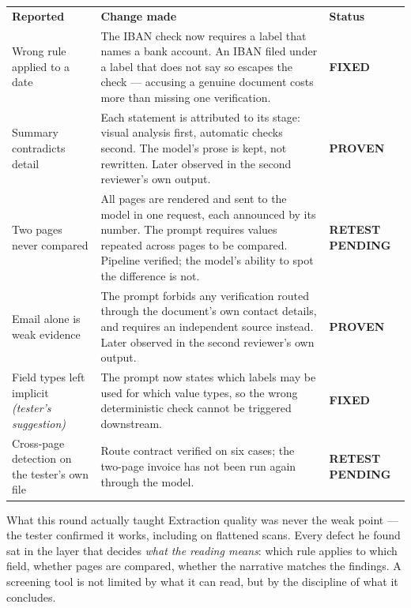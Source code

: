 \documentclass[10pt,a4paper]{article}
\newcommand{\proven}{{\footnotesize\color{good}\bfseries PROVEN}}
\newcommand{\shipped}{{\footnotesize\color{navy}\bfseries FIXED}}
\newcommand{\open}{{\footnotesize\color{bad}\bfseries RETEST PENDING}}
\begin{document}
\vspace{3pt}
\begin{tabular}{@{}>{\raggedright\arraybackslash}p{40mm}
                  >{\raggedright\arraybackslash}p{\dimexpr\linewidth-73mm}
                  >{\raggedright\arraybackslash}p{22mm}@{}}
\rowcolor{zebra}\textbf{\color{navy}Reported} & \textbf{\color{navy}Change made} &
\textbf{\color{navy}Status} \\[3pt]
Wrong rule applied to a date &
The IBAN check now requires a label that names a bank account. An IBAN filed
under a label that does not say so escapes the check --- accusing a genuine
document costs more than missing one verification. & \shipped \\[3pt]
\rowcolor{zebra}Summary contradicts detail &
Each statement is attributed to its stage: visual analysis first, automatic
checks second. The model's prose is kept, not rewritten. Later observed in the
second reviewer's own output. & \proven \\[3pt]
Two pages never compared &
All pages are rendered and sent to the model in one request, each announced by
its number. The prompt requires values repeated across pages to be compared.
Pipeline verified; the model's ability to spot the difference is not. &
\open \\[3pt]
\rowcolor{zebra}Email alone is weak evidence &
The prompt forbids any verification routed through the document's own contact
details, and requires an independent source instead. Later observed in the
second reviewer's own output. & \proven \\[3pt]
Field types left implicit \emph{(tester's suggestion)} &
The prompt now states which labels may be used for which value types, so the
wrong deterministic check cannot be triggered downstream. & \shipped \\[3pt]
\rowcolor{zebra}Cross-page detection on the tester's own file &
Route contract verified on six cases; the two-page invoice has not been run
again through the model. & \open \\
\end{tabular}

\vspace{5pt}
\begin{note}{What this round actually taught}
Extraction quality was never the weak point --- the tester confirmed it works,
including on flattened scans. Every defect he found sat in the layer that
decides \emph{what the reading means}: which rule applies to which field,
whether pages are compared, whether the narrative matches the findings. A
screening tool is not limited by what it can read, but by the discipline of what
it concludes.
\end{note}
\end{document}

